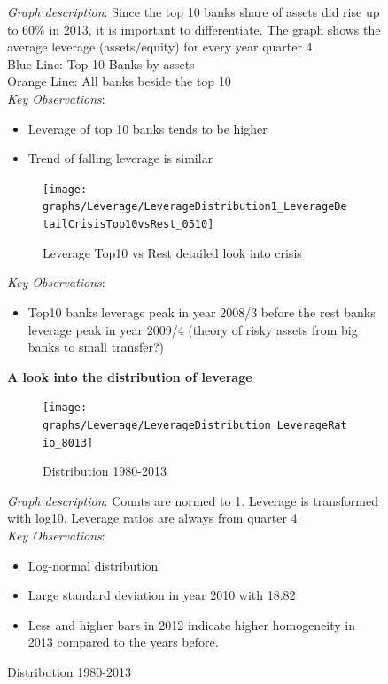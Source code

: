 \documentclass[12pt, a4paper]{article} %
\begin{document}
\begin{figure}[hbtp]
\newpage

\noindent \textit{Graph description}: Since the top 10 banks share of assets did rise up to 60\% in 2013, it is important to differentiate. The graph shows the average leverage (assets/equity) for every year quarter 4.\\ Blue Line: Top 10 Banks by assets\\
Orange Line: All banks beside the top 10\\

\noindent \textit{Key Observations}:
\begin{itemize}
\item Leverage of top 10 banks tends to be higher
\item Trend of falling leverage is similar
\end{itemize}




\begin{figure}[hbtp]
\centering
\caption{Leverage Top10 vs Rest detailed look into crisis}
\texttt{[image: graphs/Leverage/LeverageDistribution1\_LeverageDetailCrisisTop10vsRest\_0510]}
\end{figure}


\noindent \textit{Key Observations}:
\begin{itemize}
\item Top10 banks leverage peak in year 2008/3 before the rest banks leverage peak in year 2009/4 (theory of risky assets from big banks to small transfer?) 
\end{itemize}
\fi
\pagebreak

\textbf{A look into the distribution of leverage}\\



\begin{figure}[hbtp]
\centering
\caption{Distribution 1980-2013}
\texttt{[image: graphs/Leverage/LeverageDistribution\_LeverageRatio\_8013]}
\end{figure}

\noindent \textit{Graph description}: Counts are normed to 1. Leverage is transformed with log10. Leverage ratios are always from quarter 4.
\\

\noindent \textit{Key Observations}:
\begin{itemize}
\item Log-normal distribution
\item Large standard deviation in year 2010 with 18.82
\item Less and higher bars in 2012 indicate higher homogeneity in 2013 compared to the years before.
\end{itemize}


\end{figure}
\end{document}
